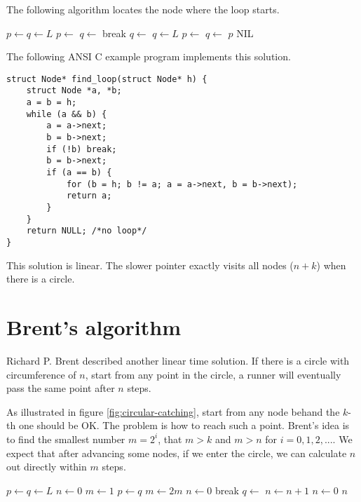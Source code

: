 \documentclass{article}
\begin{document}
The following algorithm locates the node where the loop starts.

\begin{algorithmic}[1]
  \State $p \gets q \gets L$
    \State $p \gets$ 
    \State $q \gets$ 
      \State break
    \EndIf
    \State $q \gets$ 
      \State $q \gets L$
        \State $p \gets$ 
        \State $q \gets$ 
      \EndWhile
      \State \Return $p$ 
    \EndIf
  \EndWhile
  \State \Return NIL 
\EndFunction
\end{algorithmic}

The following ANSI C example program implements this solution.

\lstset{language=C}
\begin{lstlisting}
struct Node* find_loop(struct Node* h) {
    struct Node *a, *b;
    a = b = h;
    while (a && b) {
        a = a->next;
        b = b->next;
        if (!b) break;
        b = b->next;
        if (a == b) {
            for (b = h; b != a; a = a->next, b = b->next);
            return a;
        }
    }
    return NULL; /*no loop*/
}
\end{lstlisting}

This solution is linear. The slower pointer exactly visits all nodes ($n + k$) when there is a circle.

\section{Brent's algorithm}
Richard P. Brent described another linear time solution. If there is a circle with
circumference of $n$, start from any point in the circle, a runner will eventually
pass the same point after $n$ steps.

As illustrated in figure \ref{fig:circular-catching}, start from any node behand the
$k$-th one should be OK. The problem is how to reach such a point. Brent's idea
is to find the smallest number $m = 2^i$, that $m > k$ and $m > n$ for $i = 0, 1, 2, ...$.
We expect that after advancing some nodes, if we enter the circle, we can calculate
$n$ out directly within $m$ steps.

\begin{algorithmic}[1]
  \State $p \gets q \gets L$
  \State $n \gets 0$
  \State $m \gets 1$
  \Repeat
      \State $p \gets q$
      \State $m \gets 2m$
      \State $n \gets 0$
    \EndIf
      \State break
    \EndIf
    \State $q \gets$ 
    \State $n \gets n + 1$
     \State $n \gets 0$
  \EndIf
  \State \Return $n$
\EndFunction
\end{algorithmic}
\end{document}
